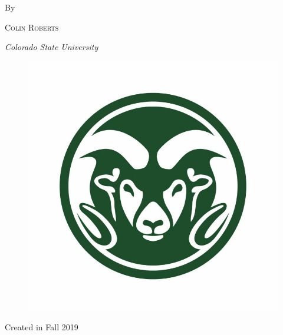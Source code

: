 \begin{titlepage}
	By
	
	\vspace{0.5\baselineskip} %
	
	{\scshape\Large Colin Roberts \\} %
	
	\vspace{0.5\baselineskip} %
	
	\textit{Colorado State University} %
	
	\vfill %
	
	
	\begin{figure}[H]
	    \centering
	    \includegraphics[width=.8\textwidth]{Frontmatter/ram_logo.jpg}
	\end{figure}
	
	\vspace{0.3\baselineskip} %
	
	Created in Fall 2019 %
	

\end{titlepage}